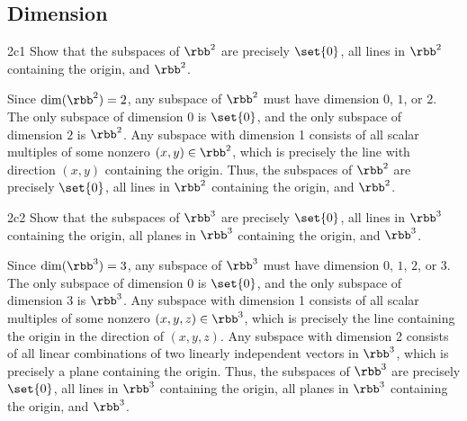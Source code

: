 \subsection{Dimension}


\begin{exercise}{2c1}
    Show that the subspaces of $\rbb^2$ are precisely $\set{0}$, all lines in $\rbb^2$ containing the origin, and $\rbb^2$.
\end{exercise}

\begin{sol}
    Since $\dim(\rbb^2) = 2$, any subspace of $\rbb^2$ must have dimension $0$, $1$, or $2$.
	The only subspace of dimension $0$ is $\set{0}$, and the only subspace of dimension $2$ is $\rbb^2$.
	Any subspace with dimension 1 consists of all scalar multiples of some nonzero $(x, y) \in \rbb^2$, which is precisely the line with direction $(x, y)$ containing the origin.
	Thus, the subspaces of $\rbb^2$ are precisely $\set{0}$, all lines in $\rbb^2$ containing the origin, and $\rbb^2$.
\end{sol}

\begin{exercise}{2c2}
    Show that the subspaces of $\rbb^3$ are precisely $\set{0}$, all lines in $\rbb^3$ containing the origin, all planes in $\rbb^3$ containing the origin, and $\rbb^3$.
\end{exercise}

\begin{sol}
    Since $\dim(\rbb^3) = 3$, any subspace of $\rbb^3$ must have dimension $0$, $1$, $2$, or $3$.
	The only subspace of dimension $0$ is $\set{0}$, and the only subspace of dimension $3$ is $\rbb^3$.
	Any subspace with dimension 1 consists of all scalar multiples of some nonzero $(x, y, z) \in \rbb^3$, which is precisely the line containing the origin in the direction of $(x, y, z)$.
	Any subspace with dimension 2 consists of all linear combinations of two linearly independent vectors in $\rbb^3$, which is precisely a plane containing the origin.
	Thus, the subspaces of $\rbb^3$ are precisely $\set{0}$, all lines in $\rbb^3$ containing the origin, all planes in $\rbb^3$ containing the origin, and $\rbb^3$.
\end{sol}

